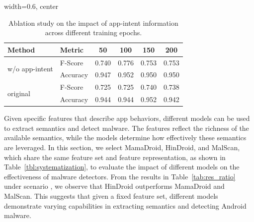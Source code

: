 \begin{table}[t]
\centering
\caption{Ablation study on the impact of app-intent information across different training epochs.}
\vspace{-0.1cm}
\label{tab:ablation_app_intent}
\begin{adjustbox}{width=0.6\linewidth, center}
\begin{tabular}{llcccc}
\toprule
\textbf{Method} & \textbf{Metric} & \textbf{50} & \textbf{100} & \textbf{150} & \textbf{200} \\
\midrule
\multirow{2}{*}{w/o app-intent}
& F-Score  & 0.740 & 0.776 & 0.753 & 0.753 \\
& Accuracy & 0.947 & 0.952 & 0.950 & 0.950 \\
\midrule
\multirow{2}{*}{original}
& F-Score  & 0.725 & 0.725 & 0.740 & 0.738 \\
& Accuracy & 0.944 & 0.944 & 0.952 & 0.942 \\
\bottomrule
\end{tabular}
\end{adjustbox}
\vspace{-0.5cm}
\end{table}

Given specific features that describe app behaviors, different models can be used to extract semantics and detect malware.
The features reflect the richness of the available semantics, while the models determine how effectively these semantics are leveraged.
In this section, we select MamaDroid, HinDroid, and MalScan, which share the same feature set and feature representation, as shown in Table~\ref{tbl:systematization}, to evaluate the impact of different models on the effectiveness of malware detectors.
From the results in Table~\ref{tab:res_ratio} under scenario , we observe that HinDroid outperforms MamaDroid and MalScan.
This suggests that given a fixed feature set, different models demonstrate varying capabilities in extracting semantics and detecting Android malware.

